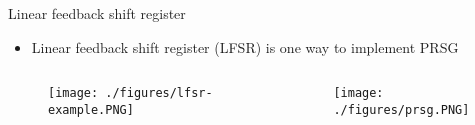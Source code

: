 \documentclass{beamer}
\begin{document}
\begin{frame}{Linear feedback shift register}
	\begin{itemize}
		\item Linear feedback shift register (LFSR) is one way to implement PRSG

	\end{itemize}
	\begin{columns}
	
	\begin{column}{5cm}
	\begin{figure}[htp]
	\centering
	\texttt{[image: ./figures/lfsr-example.PNG]}
	\end{figure}
	\end{column}
	
	\begin{column}{5cm}
	\begin{figure}[htp]
	\centering
	\texttt{[image: ./figures/prsg.PNG]}
	\end{figure}
	\end{column}	

	\end{columns}
\end{frame}	
	



%
\end{document}
